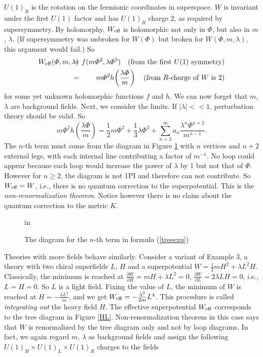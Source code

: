 \documentclass[lecture]{qft-l}
\newcommand{\lam}{\lambda}
\newcommand{\PHI}{\varPhi}
\newcommand{\bea}{\begin{eqnarray}}
\newcommand{\eea}{\end{eqnarray}}
\newcommand{\bef}{\begin{figure}[h]
		\vspace{3ex}}
\newcommand{\enf}{\end{figure}}
\newcommand{\nno}{\nonumber \\}
\newcommand{\sep}[1]{\!\!\!\! &{#1}& \!\!\!\! }
\newcommand{\eq}{\sep{=}}
\newcommand{\inv}[1]{\frac{1}{#1}}
\newcommand{\hf}{{\textstyle \inv{2}}}
\newcommand{\pdr}{\partial}
\newcommand{\eff}{_{{\rm eff}}}
\numberwithin{figure}{chapter}
\begin{document}
\bigskip\noindent
$U(1)_R$ is the rotation on the fermionic coordinates in superspace.
$W$ is invariant under the first $U(1)$ factor and has 
$U(1)_R$ charge $2$, as required by supersymmetry.
By holomorphy, $W\eff$ is holomorphic not only in $\PHI$, 
but also in $m$, $\lam$.
(If supersymmetry was unbroken for $W(\PHI)$ but broken for $W(\PHI,m,\lam)$,
this argument would fail.)
So 
	\bea
W\eff(\PHI,m,\lam)	\eq f(m\PHI^2,\lam\PHI^3)\quad
			\mbox{(from the first $U(1)$ symmetry)}		\nno
			\eq m\PHI^2h\!\left(\frac{\lam\PHI}{m}\right)\quad
			\mbox{(from $R$-charge of $W$ is 2)}
	\eea
for some yet unknown holomorphic functions $f$ and $h$.
We can now forget that $m$, $\lam$ are background fields.
Next, we consider the limits.
If $|\lam|<<1$, perturbation theory should be valid.
So 
	\begin{equation}\label{treeexp}
m\PHI^2h\!\left(\frac{\lam\PHI}{m}\right)=\inv{2}m\PHI^2+\inv{3}\lam\PHI^3
		+\sum_{n=2}^\infty a_n\frac{\lam^n\PHI^{n+2}}{m^{n-1}}.
	\end{equation}
The $n$-th term must come from the diagram in Figure \ref{PHI} 
with $n$ vertices and $n+2$ external legs, with each internal line
contributing a factor of $m^{-1}$.
No loop could appear because each loop would increase the power of $\lam$ 
by $1$ but not that of $\PHI$.
However for $n\ge2$, the diagram is not 1PI and therefore can not 
contribute.
So $W\eff=W$, i.e., there is no quantum correction to the superpotential.
This is the {\em non-renormalization theorem}.
Notice however there is no claim about the quantum correction to 
the metric $K$.

	\bef
{} in
\centerline{}
\caption{\protect\label{PHI}The diagram for the $n$-th term in formula 
(\ref{treeexp})}
	\enf

Theories with more fields behave similarly.
Consider a variant of Example 3, a theory with two chiral superfields $L$, $H$
and a superpotential $W=\hf mH^2+\lam L^2H$.
Classically, the minimum is reached at $\frac{\pdr W}{\pdr H}=mH+\lam L^2=0$,
$\frac{\pdr W}{\pdr L}=2\lam LH=0$, i.e., $L=H=0$.
So $L$ is a light field.
Fixing the value of $L$, the minimum of $W$ is reached at 
$H=-\frac{\lam L^2}{m}$, and we get $W\eff=-\frac{\lam^2}{2m}L^4$.
This procedure is called {\em integrating out} the heavy field $H$.
The effective superpotential $W\eff$ corresponds to the tree diagram
in Figure \ref{HL}.
Non-renormalization theorem in this case says that $W$ is renormalized
by the tree diagram only and not by loop diagrams.
In fact, we again regard $m$, $\lam$ as background fields and assign
the following $U(1)_H\times U(1)_L\times U(1)_R$ charges 
to the fields
\end{document}
